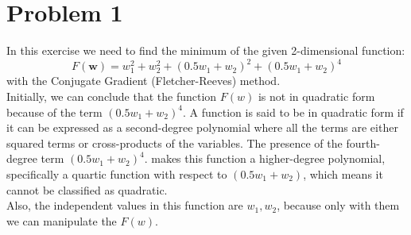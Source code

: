 \section{Problem 1}
In this exercise we need to find the minimum of the given 2-dimensional function:\\
\begin{equation}	
		F(\mathbf{w})=w_{1}^{2}+w_{2}^{2}+(0.5w_{1}+w_{2})^{2}+(0.5w_{1}+w_{2})^{4}	
\end{equation}
with the Conjugate Gradient (Fletcher-Reeves) method.\\

Initially, we can conclude that the function $F(w)$ is not in quadratic form because of the term $(0.5w_{1}+w_{2})^{4}$.
A function is said to be in quadratic form if it can be expressed as a second-degree polynomial where all the terms are either squared terms or cross-products of the variables. The presence of the fourth-degree term $(0.5w_{1}+w_{2})^{4}$.
makes this function a higher-degree polynomial, specifically a quartic function with respect to $(0.5w_{1}+w_{2})$, which means it cannot be classified as quadratic.\\
Also, the independent values in this function are $w_{1},w_{2}$, because only with them we can manipulate the $F(w)$.
